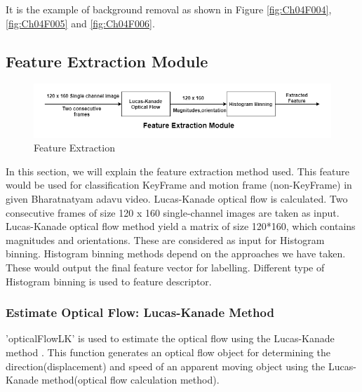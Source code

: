 It is the example of background removal as shown in Figure \ref{fig:Ch04F004}, \ref{fig:Ch04F005} and \ref{fig:Ch04F006}.
 
 
    
    
    
    
\subsection{Feature Extraction Module}

\begin{figure}[H]
  \includegraphics[scale= 0.5]{./Pictures/Algorithm-Feature_Extraction.png}
  \caption{Feature Extraction}
  \label{fig:Ch04F007}
\end{figure}
In this section, we will explain the feature extraction method used. This feature would be used for classification KeyFrame and motion frame (non-KeyFrame) in given Bharatnatyam adavu video. Lucas-Kanade optical flow is calculated. Two consecutive frames of size 120 x 160 single-channel images are taken as input. Lucas-Kanade optical flow method yield a matrix of size 120*160, which contains magnitudes and orientations. These are considered as input for Histogram binning. Histogram binning methods depend on the approaches we have taken. These would output the final feature vector for labelling. Different type of Histogram binning is used to feature descriptor.



    
\subsubsection{Estimate Optical Flow: Lucas-Kanade Method}


'opticalFlowLK' is used to estimate the optical flow using the Lucas-Kanade method \citep{barron1994performance}. This function generates an optical flow object for determining the direction(displacement) and speed of an apparent moving object using the Lucas-Kanade method(optical flow calculation method).

